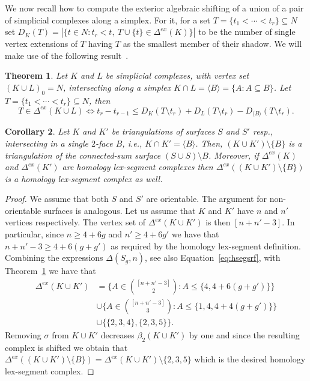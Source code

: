 \documentclass[reqno,english]{amsart}
\newtheorem{theorem}{Theorem}
\newtheorem{corollary}[theorem]{Corollary}
\numberwithin{claimcounter}{theorem}
\theoremstyle{remark}
\theoremstyle{definition}
\numberwithin{theorem}{section}
\newcommand{\exshift}[1]{\Delta^{ex}(#1)}
\begin{document}
We now recall how to compute the exterior algebraic shifting of a union of a pair of simplicial complexes along a simplex. For it, for a set $T=\{t_1<\cdots <t_r\}\subseteq N$ set $D_K(T) = |\{ t \in N \colon t_r<t,~T\cup \{t\} \in \exshift{K} \}|$ to be the number of single vertex extensions of $T$ having $T$ as the smallest member of their shadow. We will make use of the following result~\cite[Theorem 4.6]{nevo05-basic}.
\begin{theorem}
  \label{t:simplex-union}
  Let $K$ and $L$ be simplicial complexes, with vertex set $(K\cup L)_0 = N$, intersecting along a simplex $K\cap L = \langle B\rangle = \{A \colon A\subseteq B\}$. Let $T=\{t_1<\cdots <t_r\}\subseteq N$, then
  $$T\in \exshift{K\cup L} \iff t_r-t_{r-1}\leq D_K(T\setminus t_r)+D_L(T\setminus t_r)-D_{\langle B \rangle}(T\setminus t_r).$$
  
\end{theorem}


\begin{corollary}
  \label{c:gluehomlex}
  Let $K$ and $K'$ be triangulations of surfaces $S$ and $S'$ resp., intersecting in  
  a single $2$-face $B$, i.e., $K\cap K' = \langle B\rangle$.
  Then, $(K\cup K')\setminus \{B\}$ is a triangulation of the connected-sum surface $(S\cup S) \setminus B$.
  Moreover, if $\exshift K$ and $\exshift{K'}$ are homology lex-segment complexes then $\exshift{(K\cup K') \setminus \{ B \} }$ is a homology lex-segment complex as well.
\end{corollary}
\begin{proof}
    We assume that both $S$ and $S'$ are orientable. The argument for non-orientable surfaces is analogous.
    Let us assume that $K$ and $K'$ have $n$ and $n'$ vertices respectively. The vertex set of $\exshift{K \cup K'}$ is then $[n+n'-3]$. In particular, since $n\geq 4+6g$ and $n'\geq 4+6g'$ we have that $n+n'-3\geq 4+6(g+g')$ as required by the homology lex-segment definition. Combining the expressions $\Delta(S_g,n)$, see also Equation~\eqref{eq:hsegsrf}, with Theorem~\ref{t:simplex-union} we have that 
    \begin{align*}
    \exshift{K\cup K'} &= \{ A \in \binom{[n+n'-3]}{2}\colon A \leq \{4,4+6(g+g')\}\} \\ &\cup \{ A \in \binom{[n+n'-3]}{3}\colon A \leq \{1,4,4+4(g+g')\}\}\\ &\cup \{\{2,3,4\},\{2,3,5\}\}.
    \end{align*}
    Removing $\sigma$ from $K\cup K'$ decreases $\beta_2(K\cup K')$ by one and since the resulting complex is shifted we obtain that $\exshift{(K\cup K') \setminus \{B\}} = \exshift{K\cup K'} \setminus \{2,3,5\}$ which is the desired homology lex-segment complex.
\end{proof}
\end{document}
